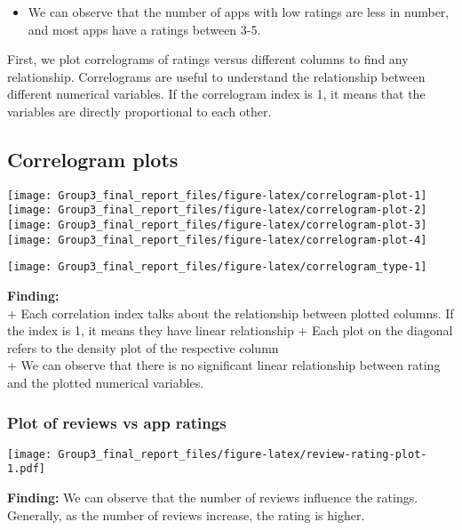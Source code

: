\documentclass[
]{article}
\providecommand{\tightlist}{%
  \setlength{\itemsep}{0pt}\setlength{\parskip}{0pt}}
\begin{document}
\begin{itemize}
\tightlist
\item
  We can observe that the number of apps with low ratings are less in
  number, and most apps have a ratings between 3-5.
\end{itemize}

First, we plot correlograms of ratings versus different columns to find
any relationship. Correlograms are useful to understand the relationship
between different numerical variables. If the correlogram index is 1, it
means that the variables are directly proportional to each other.

\hypertarget{correlogram-plots}{%
\subsection{Correlogram plots}\label{correlogram-plots}}

\begin{center}\texttt{[image: Group3\_final\_report\_files/figure-latex/correlogram-plot-1]} \texttt{[image: Group3\_final\_report\_files/figure-latex/correlogram-plot-2]} \texttt{[image: Group3\_final\_report\_files/figure-latex/correlogram-plot-3]} \texttt{[image: Group3\_final\_report\_files/figure-latex/correlogram-plot-4]} \end{center}

\texttt{[image: Group3\_final\_report\_files/figure-latex/correlogram\_type-1]}

\textbf{Finding:}\\
+ Each correlation index talks about the relationship between plotted
columns. If the index is 1, it means they have linear relationship +
Each plot on the diagonal refers to the density plot of the respective
column\\
+ We can observe that there is no significant linear relationship
between rating and the plotted numerical variables.

\hypertarget{plot-of-reviews-vs-app-ratings}{%
\subsubsection{Plot of reviews vs app
ratings}\label{plot-of-reviews-vs-app-ratings}}

\texttt{[image: Group3\_final\_report\_files/figure-latex/review-rating-plot-1.pdf]}

\textbf{Finding:} We can observe that the number of reviews influence
the ratings. Generally, as the number of reviews increase, the rating is
higher.
\end{document}
